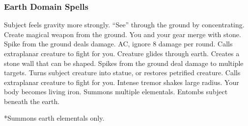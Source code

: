 \begin{comment}
\subsubsection{Dragon Domain Spells}

\begin{spelllist}
  \spellheadc[1]{Burning Hands}\fn{1} 1d6 fire damage.
  \spellhead[1]{Command} One subject obeys selected command for 1 round.
  \spellhead[2]{}
  \spellhead[2]{Locate Object} Senses direction toward object (specific or type).
  \spellheadc[3]{Lightning Bolt}\fn{1} Large line of electricity deals 3d8 damage.
  \spellhead[4]{Fly} Subject flies at speed of 60 ft.
  \spellhead[4]{Suggestion} Compels subject to follow stated course of action.
  \spellheadc[5]{Command}{Mass} As \spell{command}, but affects multiple creatures.
  \spellheadc[5]{Cone of Cold}\fn{1} 5d8 cold damage and brief slow in large cone.
  \spellhead[6]{Locate Entity} Locates creatures or objects within 1 mile.
  \spellhead[6]{True Seeing}\M Lets you see all things as they really are.
  \spellhead[7]{Overland Flight} You fly at a speed of 40 ft. and can hustle over long distances.
  \spellhead[7]{Power Word Blind} Blinds bloodied creature.
  \spellhead[8]{Power Word Stun} Stuns bloodied creature.
  \spellheadc[8]{Suggestion}{Mass} As \spell{suggestion}, but shorter and affects multiple creatures.
  \spellhead[9]{Power Word Kill} Kills bloodied creature.
  \spellhead[9]{}
\end{spelllist}
1 Used as a breath attack, requiring no somatic components.
\end{comment}

\subsubsection{Earth Domain Spells}

\begin{spelllist}
   Subject feels gravity more strongly.
   ``See'' through the ground by concentrating.
   Create magical weapon from the ground.
  \spellhead[2]{}
   You and your gear merge with stone.
   Spike from the ground deals damage. 
    AC, ignore 8 damage per round.
   Calls extraplanar creature to fight for you.
   Creature glides through earth. 
   Creates a stone wall that can be shaped.
   Spikes from the ground deal damage to multiple targets.
   Turns subject creature into statue, or restores petrified creature.
  \spellhead[7]{}
   Calls extraplanar creature to fight for you.
   Intense tremor shakes large radius.
   Your body becomes living iron.
   Summons multiple elementals.
   Entombs subject beneath the earth.
\end{spelllist}
*Summons earth elementals only.

